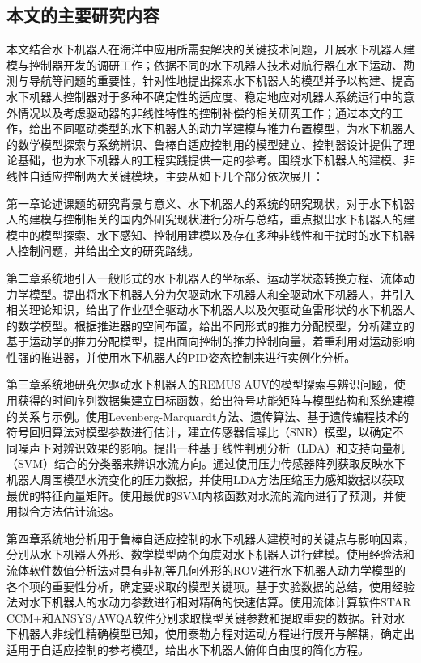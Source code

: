 \subsection{本文的主要研究内容 }

本文结合水下机器人在海洋中应用所需要解决的关键技术问题，开展水下机器人建模与控制器开发的调研工作；依据不同的水下机器人技术对航行器在水下运动、勘测与导航等问题的重要性，针对性地提出探索水下机器人的模型并予以构建、提高水下机器人控制器对于多种不确定性的适应度、稳定地应对机器人系统运行中的意外情况以及考虑驱动器的非线性特性的控制补偿的相关研究工作；通过本文的工作，给出不同驱动类型的水下机器人的动力学建模与推力布置模型，为水下机器人的数学模型探索与系统辨识、鲁棒自适应控制用的模型建立、控制器设计提供了理论基础，也为水下机器人的工程实践提供一定的参考。围绕水下机器人的建模、非线性自适应控制两大关键模块，主要从如下几个部分依次展开：

第一章论述课题的研究背景与意义、水下机器人的系统的研究现状，对于水下机器人的建模与控制相关的国内外研究现状进行分析与总结，重点拟出水下机器人的建模中的模型探索、水下感知、控制用建模以及存在多种非线性和干扰时的水下机器人控制问题，并给出全文的研究路线。

第二章系统地引入一般形式的水下机器人的坐标系、运动学状态转换方程、流体动力学模型。提出将水下机器人分为欠驱动水下机器人和全驱动水下机器人，并引入相关理论知识，给出了作业型全驱动水下机器人以及欠驱动鱼雷形状的水下机器人的数学模型。根据推进器的空间布置，给出不同形式的推力分配模型，分析建立的基于运动学的推力分配模型，提出面向控制的推力控制向量，着重利用对运动影响性强的推进器，并使用水下机器人的PID姿态控制来进行实例化分析。

第三章系统地研究欠驱动水下机器人的REMUS AUV的模型探索与辨识问题，使用获得的时间序列数据集建立目标函数，给出符号功能矩阵与模型结构和系统建模的关系与示例。使用Levenberg-Marquardt方法、遗传算法、基于遗传编程技术的符号回归算法对模型参数进行估计，建立传感器信噪比（SNR）模型，以确定不同噪声下对辨识效果的影响。提出一种基于线性判别分析（LDA）和支持向量机（SVM）结合的分类器来辨识水流方向。通过使用压力传感器阵列获取反映水下机器人周围模型水流变化的压力数据，并使用LDA方法压缩压力感知数据以获取最优的特征向量矩阵。使用最优的SVM内核函数对水流的流向进行了预测，并使用拟合方法估计流速。


第四章系统地分析用于鲁棒自适应控制的水下机器人建模时的关键点与影响因素，分别从水下机器人外形、数学模型两个角度对水下机器人进行建模。使用经验法和流体软件数值分析法对具有非初等几何外形的ROV进行水下机器人动力学模型的各个项的重要性分析，确定要求取的模型关键项。基于实验数据的总结，使用经验法对水下机器人的水动力参数进行相对精确的快速估算。使用流体计算软件STAR CCM+和ANSYS/AWQA软件分别求取模型关键参数和提取重要的数据。针对水下机器人非线性精确模型已知，使用泰勒方程对运动方程进行展开与解耦，确定出适用于自适应控制的参考模型，给出水下机器人俯仰自由度的简化方程。


